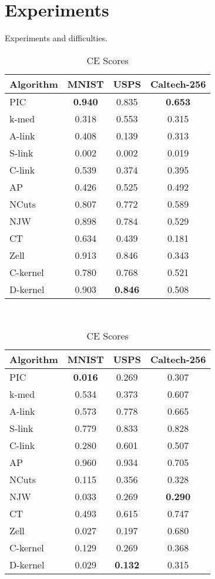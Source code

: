 \section{Experiments}
Experiments and difficulties.

\begin{table}[H]
\centering
\begin{tabular}{|l|c|c|c|}
\hline
\textbf{Algorithm} & \textbf{MNIST} & \textbf{USPS} & \textbf{Caltech-256} \\
\hline
PIC       & \textbf{0.940} & 0.835 & \textbf{0.653} \\ \hline
k-med     & 0.318 & 0.553 & 0.315 \\ \hline
A-link    & 0.408 & 0.139 & 0.313 \\ \hline
S-link    & 0.002 & 0.002 & 0.019 \\ \hline
C-link    & 0.539 & 0.374 & 0.395 \\ \hline
AP        & 0.426 & 0.525 & 0.492 \\ \hline
NCuts     & 0.807 & 0.772 & 0.589 \\ \hline
NJW       & 0.898 & 0.784 & 0.529 \\ \hline
CT        & 0.634 & 0.439 & 0.181 \\ \hline
Zell      & 0.913 & 0.846 & 0.343 \\ \hline
C-kernel  & 0.780 & 0.768 & 0.521 \\ \hline
D-kernel  & 0.903 & \textbf{0.846} & 0.508 \\
\hline
\end{tabular}
\caption{NMI Scores}
\label{table:nmi_scores}
\phantom{ }\\[0.5em]
\centering
\begin{tabular}{|l|c|c|c|}
\hline
\textbf{Algorithm} & \textbf{MNIST} & \textbf{USPS} & \textbf{Caltech-256} \\
\hline
PIC       & \textbf{0.016} & 0.269 & 0.307 \\ \hline
k-med     & 0.534 & 0.373 & 0.607 \\ \hline
A-link    & 0.573 & 0.778 & 0.665 \\ \hline
S-link    & 0.779 & 0.833 & 0.828 \\ \hline
C-link    & 0.280 & 0.601 & 0.507 \\ \hline
AP        & 0.960 & 0.934 & 0.705 \\ \hline
NCuts     & 0.115 & 0.356 & 0.328 \\ \hline
NJW       & 0.033 & 0.269 & \textbf{0.290} \\ \hline
CT        & 0.493 & 0.615 & 0.747 \\ \hline
Zell      & 0.027 & 0.197 & 0.680 \\ \hline
C-kernel  & 0.129 & 0.269 & 0.368 \\ \hline
D-kernel  & 0.029 & \textbf{0.132} & 0.315 \\
\hline
\end{tabular}
\caption{CE Scores}
\label{table:ce_scores}
\end{table}

\begin{table}[H]

\end{table}

